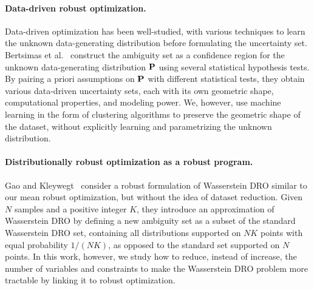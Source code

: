 \documentclass[12pt]{article}
\theoremstyle{thmstyleone}%
\theoremstyle{thmstyletwo}%
\theoremstyle{thmstylethree}%
\newcommand{\reviewChanges}{}
\begin{document}
\paragraph{Data-driven robust optimization.}
Data-driven optimization has been well-studied, with various techniques to learn the unknown data-generating distribution before formulating the uncertainty set.
Bertsimas et al.~\cite{bertsimas_data-driven_2018} construct the ambiguity set as a confidence region for the unknown data-generating distribution ${\mathbf P}$ using several statistical hypothesis tests.
By pairing a priori assumptions on ${\mathbf P}$ with different statistical tests, they obtain various data-driven uncertainty sets, each with its own geometric shape, computational properties, and modeling power.
We, however, use machine learning in the form of clustering algorithms to preserve the geometric shape of the dataset, without explicitly learning and parametrizing the unknown distribution.

\paragraph{Distributionally robust optimization as a robust program.}
Gao and Kleywegt~\cite{gao2016distributionally} consider a robust formulation of Wasserstein \gls{DRO} similar to our mean robust optimization, but without the idea of dataset reduction.
\reviewChanges{
Given $N$ samples and a positive integer $K$, they introduce an approximation of Wasserstein \gls{DRO} by defining a new ambiguity set as a subset of the standard Wasserstein \gls{DRO} set, containing all distributions supported on $NK$ points with equal probability $1/(NK)$, as opposed to the standard set supported on $N$ points.}
In this work, however, we study how to reduce, instead of increase, the number of variables and constraints to make the Wasserstein \gls{DRO} problem more tractable by linking it to robust optimization.
\end{document}
